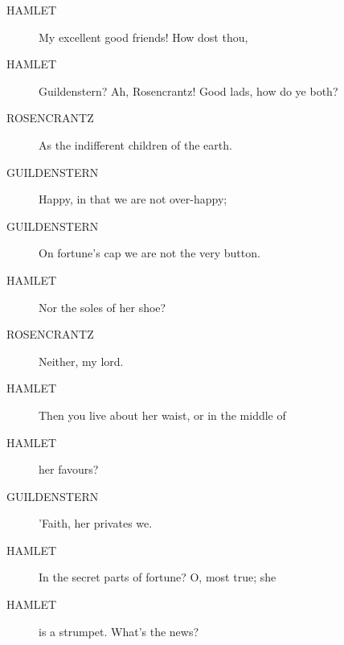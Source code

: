 \documentclass{article}
\begin{document}
\begin{description}
            
\item[HAMLET] My excellent good friends! How dost thou,
\item[HAMLET] Guildenstern? Ah, Rosencrantz! Good lads, how do ye both?
\end{description}
          
\begin{description}
            
\item[ROSENCRANTZ] As the indifferent children of the earth.
\end{description}
          
\begin{description}
            
\item[GUILDENSTERN] Happy, in that we are not over-happy;
\item[GUILDENSTERN] On fortune's cap we are not the very button.
\end{description}
          
\begin{description}
            
\item[HAMLET] Nor the soles of her shoe?
\end{description}
          
\begin{description}
            
\item[ROSENCRANTZ] Neither, my lord.
\end{description}
          
\begin{description}
            
\item[HAMLET] Then you live about her waist, or in the middle of
\item[HAMLET] her favours?
\end{description}
          
\begin{description}
            
\item[GUILDENSTERN] 'Faith, her privates we.
\end{description}
          
\begin{description}
            
\item[HAMLET] In the secret parts of fortune? O, most true; she
\item[HAMLET] is a strumpet. What's the news?
\end{description}
          
\end{document}
